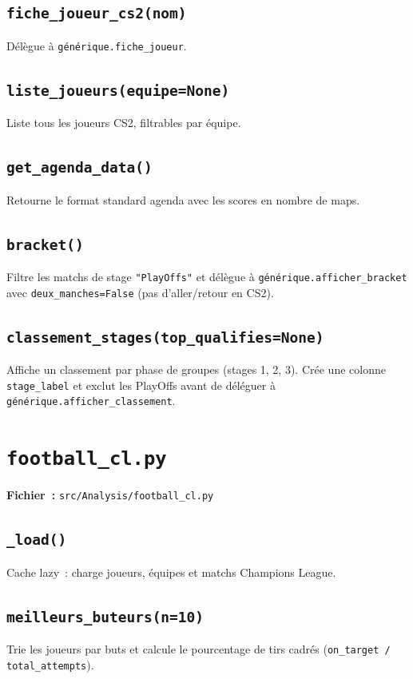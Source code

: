 \documentclass[12pt,a4paper]{article}
\begin{document}
\subsection{\texttt{fiche\_joueur\_cs2(nom)}}
Délègue à \texttt{générique.fiche\_joueur}.

\subsection{\texttt{liste\_joueurs(equipe=None)}}
Liste tous les joueurs CS2, filtrables par équipe.

\subsection{\texttt{get\_agenda\_data()}}
Retourne le format standard agenda avec les scores en nombre de maps.

\subsection{\texttt{bracket()}}
Filtre les matchs de stage \texttt{"PlayOffs"} et délègue à
\texttt{générique.afficher\_bracket} avec \texttt{deux\_manches=False}
(pas d'aller/retour en CS2).

\subsection{\texttt{classement\_stages(top\_qualifies=None)}}
Affiche un classement par phase de groupes (stages 1, 2, 3). Crée une colonne
\texttt{stage\_label} et exclut les PlayOffs avant de déléguer à
\texttt{générique.afficher\_classement}.

\section{\texttt{football\_cl.py}}

\textbf{Fichier~:} \texttt{src/Analysis/football\_cl.py}

\subsection{\texttt{\_load()}}
Cache lazy~: charge joueurs, équipes et matchs Champions League.

\subsection{\texttt{meilleurs\_buteurs(n=10)}}
Trie les joueurs par buts et calcule le pourcentage de tirs cadrés
(\texttt{on\_target / total\_attempts}).
\end{document}
